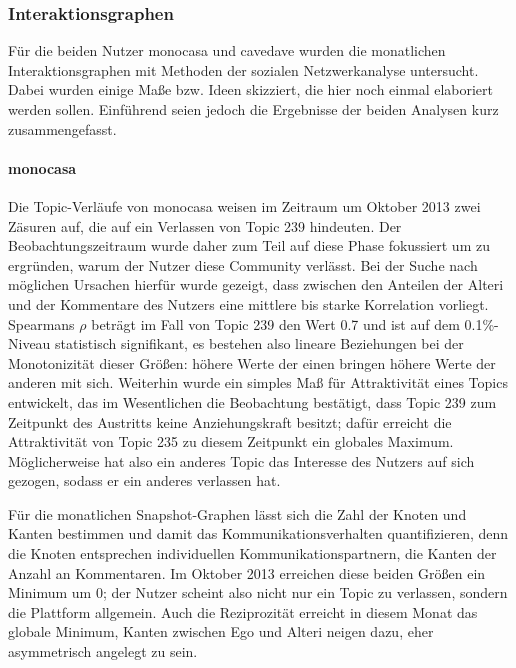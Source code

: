 \documentclass[11pt,a4paper,twoside]{article}
\let\oldpar\paragraph
\renewcommand{\paragraph}{\oldpar*}
\begin{document}
\hypertarget{interaktionsgraphen-1}{%
\subsubsection{Interaktionsgraphen}\label{interaktionsgraphen-1}}

Für die beiden Nutzer monocasa und cavedave wurden die monatlichen
Interaktionsgraphen mit Methoden der sozialen Netzwerkanalyse
untersucht. Dabei wurden einige Maße bzw. Ideen skizziert, die hier noch
einmal elaboriert werden sollen. Einführend seien jedoch die Ergebnisse
der beiden Analysen kurz zusammengefasst.

\hypertarget{monocasa-1}{%
\paragraph{monocasa}\label{monocasa-1}}

Die Topic-Verläufe von monocasa weisen im Zeitraum um Oktober 2013 zwei
Zäsuren auf, die auf ein Verlassen von Topic 239 hindeuten. Der
Beobachtungszeitraum wurde daher zum Teil auf diese Phase fokussiert um
zu ergründen, warum der Nutzer diese Community verlässt. Bei der Suche
nach möglichen Ursachen hierfür wurde gezeigt, dass zwischen den
Anteilen der Alteri und der Kommentare des Nutzers eine mittlere bis
starke Korrelation vorliegt. Spearmans \(\rho\) beträgt im Fall von
Topic 239 den Wert 0.7 und ist auf dem 0.1\%-Niveau statistisch
signifikant, es bestehen also lineare Beziehungen bei der Monotonizität
dieser Größen: höhere Werte der einen bringen höhere Werte der anderen
mit sich. Weiterhin wurde ein simples Maß für Attraktivität eines Topics
entwickelt, das im Wesentlichen die Beobachtung bestätigt, dass Topic
239 zum Zeitpunkt des Austritts keine Anziehungskraft besitzt; dafür
erreicht die Attraktivität von Topic 235 zu diesem Zeitpunkt ein
globales Maximum. Möglicherweise hat also ein anderes Topic das
Interesse des Nutzers auf sich gezogen, sodass er ein anderes verlassen
hat.

Für die monatlichen Snapshot-Graphen lässt sich die Zahl der Knoten und
Kanten bestimmen und damit das Kommunikationsverhalten quantifizieren,
denn die Knoten entsprechen individuellen Kommunikationspartnern, die
Kanten der Anzahl an Kommentaren. Im Oktober 2013 erreichen diese beiden
Größen ein Minimum um 0; der Nutzer scheint also nicht nur ein Topic zu
verlassen, sondern die Plattform allgemein. Auch die Reziprozität
erreicht in diesem Monat das globale Minimum, Kanten zwischen Ego und
Alteri neigen dazu, eher asymmetrisch angelegt zu sein.
\end{document}
